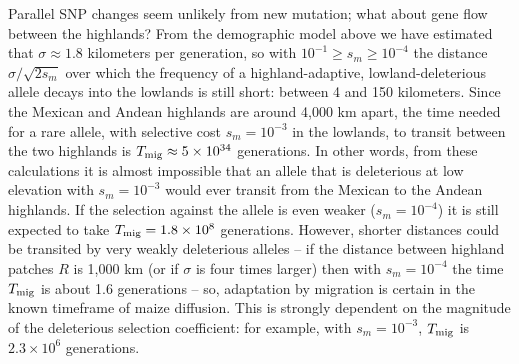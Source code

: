 {{Parallel SNP changes seem unlikely from new mutation; 
what about gene flow between the highlands?
From the demographic model above
we have estimated that $\sigma \approx 1.8$ kilometers per generation,
so with $10^{-1} \ge s_m \ge 10^{-4}$ the distance $\sigma/\sqrt{2s_m}$ over which the frequency of 
a highland-adaptive, lowland-deleterious allele decays into the lowlands
is still short: between 4 and 150 kilometers.
Since the Mexican and Andean highlands are around 4,000 km apart,
the time needed for a rare allele, with selective cost $s_m=10^{-3}$ in the lowlands, to transit between the two highlands
is $T_{\text{mig}} \approx 5 \times 10^{34}$ generations.
In other words, from these calculations it is almost impossible that an allele that is deleterious at low elevation with $s_m=10^{-3}$ 
would ever transit from the Mexican to the Andean highlands.
If the selection against the allele is even weaker ($s_m=10^{-4}$) it is still expected to take $T_{\text{mig}} = 1.8 \times 10^8$ generations.
However, shorter distances could be transited by very weakly deleterious alleles --
if the distance between highland patches $R$ is 1,000 km (or if $\sigma$ is four times larger)
then with $s_m=10^{-4}$ the time $T_{\text{mig}}$ is about 1.6 generations --
so, adaptation by migration is certain in the known timeframe of maize diffusion.
This is strongly dependent on the magnitude of the deleterious selection coefficient: for example,
with $s_m=10^{-3}$, $T_{\text{mig}}$ is $2.3 \times 10^6$ generations.

}}
